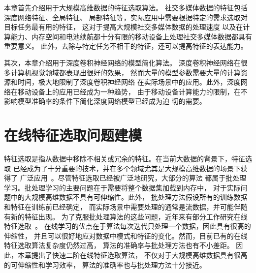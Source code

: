 \documentclass[doctor]{ustcthesis}
\begin{document}
本章首先介绍用于大规模高维数据的特征选取算法。 社交多媒体数据的特征包括深度网络特征、全局特征、
局部特征等，实际应用中需要根据特定的需求选取对目标任务最有用的特征，
这对于提高大规模社交多媒体数据的处理速度
以及在计算能力、内存空间和电池续航都十分有限的移动设备上处理社交多媒体数据都具有重要意义。
此外，去除与特定任务不相干的特征，还可以提高特征的表达能力。

其次，本章介绍用于深度卷积神经网络的模型简化算法。
深度卷积神经网络在很多计算机视觉领域都表现出很好的效果，
然而大量的模型参数需要大量的计算资源和时间，极大地限制了深度卷积神经网络
在实际场景中的应用。此外，深度网络在移动设备上的应用已经成为一种趋势，
由于移动设备计算能力的限制，在不影响模型准确率的条件下简化深度网络模型已经成为迫
切的需要。

\section{在线特征选取问题建模}
特征选取是指从数据中移除不相关或冗余的特征。在当前大数据的背景下，特征选取
已经成为了十分重要的技术，并在多个领域尤其是大规模高维数据的场景下获得了
广泛应用~\cite{Bolon015RAE,Zhai14EBD}。尽管特征选取已经被广泛地研究，大部分的算法
都属于批处理学习。批处理学习的主要问题在于需要将整个数据集加载到内存中，
对于实际问题中的大规模高维数据不具有可伸缩性。此外，
批处理方法假设所有的训练数据和特征在训练前已经确定，
而实际场景中需要处理的通常是流数据，并可能伴随有新的特征出现。
为了克服批处理算法的这些问题，近年来有部分工作研究在线特征选取~\cite{wang2014online,wu2010online,yang2013efficient}。
在线学习的优点在于算法每次迭代只处理一个数据，因此具有很高的伸缩性，
并且可以很好地应对数据中模式和特征的变化。然而，目前已有的在线特征选取算法复杂度仍然过高，
算法的准确率与批处理方法也有不小差距。
因此，本章提出了快速二阶在线特征选取算法，
不仅对于大规模高维数据具有很高的可伸缩性和学习效率，
算法的准确率也与批处理方法十分接近。
\end{document}
